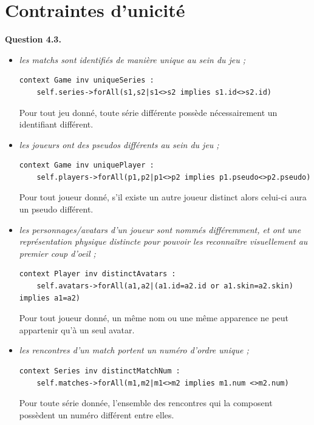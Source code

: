 \documentclass[oneside,a4paper]{book}
\begin{document}
\section{Contraintes d'unicité}
\textbf{Question 4.3.}\label{Question 4.3.}
\begin{itemize}
    \item \textit{les matchs sont identifiés de manière unique au sein du jeu ;}
        \begin{lstlisting}
context Game inv uniqueSeries : 
    self.series->forAll(s1,s2|s1<>s2 implies s1.id<>s2.id)
        \end{lstlisting}
        Pour tout jeu donné, toute série différente possède nécessairement un identifiant différent.
        
    \item \textit{les joueurs ont des pseudos différents au sein du jeu ;}
        \begin{lstlisting}
context Game inv uniquePlayer : 
    self.players->forAll(p1,p2|p1<>p2 implies p1.pseudo<>p2.pseudo)
        \end{lstlisting}
    Pour tout joueur donné, s'il existe un autre joueur distinct alors celui-ci aura un pseudo différent.
    
    \item \textit{les personnages/avatars d'un joueur sont nommés différemment, et ont une représentation physique distincte pour pouvoir les reconnaître visuellement au premier coup d'oeil ;}
        \begin{lstlisting}
context Player inv distinctAvatars : 
    self.avatars->forAll(a1,a2|(a1.id=a2.id or a1.skin=a2.skin) implies a1=a2)
        \end{lstlisting}
        Pour tout joueur donné, un même nom ou une même apparence ne peut appartenir qu'à un seul avatar.

    \item \textit{les rencontres d'un match portent un numéro d'ordre unique ;}
        \begin{lstlisting}
context Series inv distinctMatchNum : 
    self.matches->forAll(m1,m2|m1<>m2 implies m1.num <>m2.num)
        \end{lstlisting}
        Pour toute série donnée, l'ensemble des rencontres qui la composent possèdent un numéro différent entre elles.
\end{itemize}
\end{document}
